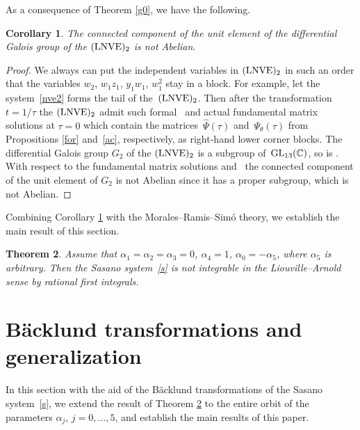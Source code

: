 \documentclass[pdftex]{sigma}
\numberwithin{equation}{section}
\newtheorem{Theorem}{Theorem}[section]
\newtheorem{Corollary}[Theorem]{Corollary}
\begin{document}
 As a consequence of Theorem \ref{g0}, we have the following.

 \begin{Corollary}\label{go}
 The connected component  of the unit element of the differential Galois group of the
 $({\rm LNVE})_2$ is not Abelian.
 \end{Corollary}

\begin{proof}
We always can put the independent variables in $({\rm LNVE})_2$ in such an order that the variables
 $w_2$, $w_1 z_1$, $y_1 w_1$, $w_1^2$ stay in a block. For example, let the system~\eqref{nve2} forms the tail of
 the~$({\rm LNVE})_2$. Then after the transformation $t=1/\tau$ the $({\rm LNVE})_2$ admit such
 formal~ and actual  fundamental matrix solutions
 at $\tau=0$ which contain the matrices~$\hat{\Psi}(\tau)$ and~$\Psi_{\theta}(\tau)$ from Propositions \ref{for} and~\ref{ac},
 respectively, as right-hand lower corner blocks.
 The differential Galois group $G_2$ of the $({\rm LNVE})_2$ is a subgroup of~${\rm GL}_{13}(\mathbb{C})$, so is .
 With respect to the fundamental matrix solutions
  and~ the connected component
 of the unit element  of $G_2$ is not Abelian since it has a proper
 subgroup, which is not Abelian.
\end{proof}

Combining Corollary \ref{go} with the Morales--Ramis--Sim\'{o} theory, we establish the main result of this section.

 \begin{Theorem}\label{main-s}
 Assume that $\alpha_1=\alpha_2=\alpha_3=0$, $\alpha_4=1$, $\alpha_0=-\alpha_5$, where $\alpha_5$ is arbitrary. Then the
 Sasano system~\eqref{s} is not integrable in the Liouville--Arnold sense by rational first integrals.
 \end{Theorem}

 \section{B\"{a}cklund transformations and generalization}\label{section4}

 In this section with the aid of the B\"{a}cklund transformations of the Sasano system~\eqref{s}, we extend the result of Theorem \ref{main-s}
 to the entire orbit of the parameters $\alpha_j$, $j=0, \dots, 5$, and establish the main results of this paper.
\end{document}

